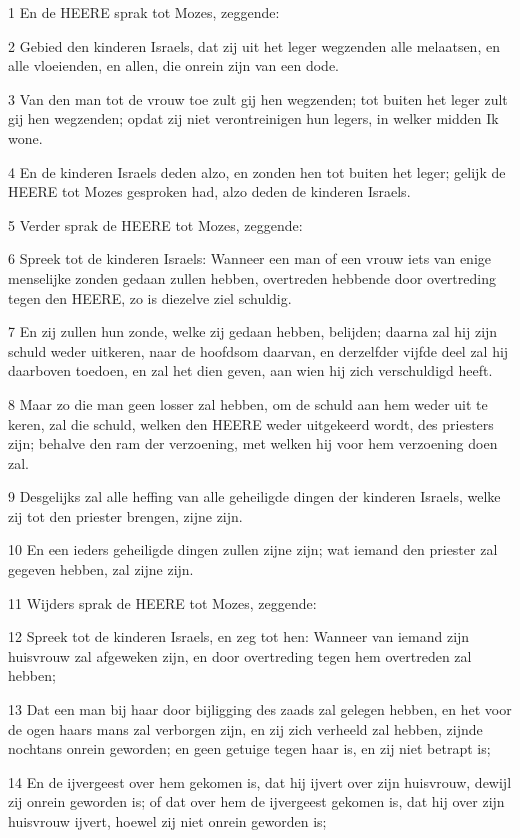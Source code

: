 \par 1 En de HEERE sprak tot Mozes, zeggende:
\par 2 Gebied den kinderen Israels, dat zij uit het leger wegzenden alle melaatsen, en alle vloeienden, en allen, die onrein zijn van een dode.
\par 3 Van den man tot de vrouw toe zult gij hen wegzenden; tot buiten het leger zult gij hen wegzenden; opdat zij niet verontreinigen hun legers, in welker midden Ik wone.
\par 4 En de kinderen Israels deden alzo, en zonden hen tot buiten het leger; gelijk de HEERE tot Mozes gesproken had, alzo deden de kinderen Israels.
\par 5 Verder sprak de HEERE tot Mozes, zeggende:
\par 6 Spreek tot de kinderen Israels: Wanneer een man of een vrouw iets van enige menselijke zonden gedaan zullen hebben, overtreden hebbende door overtreding tegen den HEERE, zo is diezelve ziel schuldig.
\par 7 En zij zullen hun zonde, welke zij gedaan hebben, belijden; daarna zal hij zijn schuld weder uitkeren, naar de hoofdsom daarvan, en derzelfder vijfde deel zal hij daarboven toedoen, en zal het dien geven, aan wien hij zich verschuldigd heeft.
\par 8 Maar zo die man geen losser zal hebben, om de schuld aan hem weder uit te keren, zal die schuld, welken den HEERE weder uitgekeerd wordt, des priesters zijn; behalve den ram der verzoening, met welken hij voor hem verzoening doen zal.
\par 9 Desgelijks zal alle heffing van alle geheiligde dingen der kinderen Israels, welke zij tot den priester brengen, zijne zijn.
\par 10 En een ieders geheiligde dingen zullen zijne zijn; wat iemand den priester zal gegeven hebben, zal zijne zijn.
\par 11 Wijders sprak de HEERE tot Mozes, zeggende:
\par 12 Spreek tot de kinderen Israels, en zeg tot hen: Wanneer van iemand zijn huisvrouw zal afgeweken zijn, en door overtreding tegen hem overtreden zal hebben;
\par 13 Dat een man bij haar door bijligging des zaads zal gelegen hebben, en het voor de ogen haars mans zal verborgen zijn, en zij zich verheeld zal hebben, zijnde nochtans onrein geworden; en geen getuige tegen haar is, en zij niet betrapt is;
\par 14 En de ijvergeest over hem gekomen is, dat hij ijvert over zijn huisvrouw, dewijl zij onrein geworden is; of dat over hem de ijvergeest gekomen is, dat hij over zijn huisvrouw ijvert, hoewel zij niet onrein geworden is;
